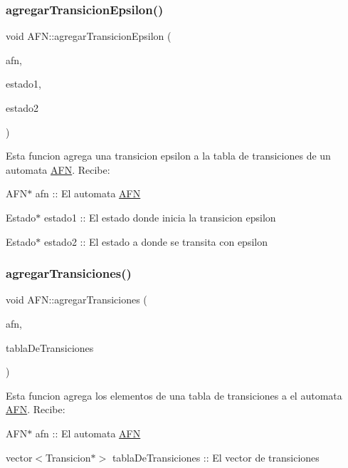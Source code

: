 \subsubsection{\texorpdfstring{agregar\+Transicion\+Epsilon()}{agregarTransicionEpsilon()}}
{\footnotesize\ttfamily void A\+F\+N\+::agregar\+Transicion\+Epsilon (\begin{DoxyParamCaption}\item[{\hyperlink{class_a_f_n}{A\+FN} $\ast$}]{afn,  }\item[{\hyperlink{class_estado}{Estado} $\ast$}]{estado1,  }\item[{\hyperlink{class_estado}{Estado} $\ast$}]{estado2 }\end{DoxyParamCaption})}

Esta funcion agrega una transicion epsilon a la tabla de transiciones de un automata \hyperlink{class_a_f_n}{A\+FN}. Recibe\+:
\begin{DoxyItemize}
\item A\+F\+N$\ast$ afn \+:\+: El automata \hyperlink{class_a_f_n}{A\+FN}
\item Estado$\ast$ estado1 \+:\+: El estado donde inicia la transicion epsilon
\item Estado$\ast$ estado2 \+:\+: El estado a donde se transita con epsilon 
\end{DoxyItemize}\mbox{\label{class_a_f_n_aec249b192efe9df63c9e6df4ef5b96af}} 
\subsubsection{\texorpdfstring{agregar\+Transiciones()}{agregarTransiciones()}}
{\footnotesize\ttfamily void A\+F\+N\+::agregar\+Transiciones (\begin{DoxyParamCaption}\item[{\hyperlink{class_a_f_n}{A\+FN} $\ast$}]{afn,  }\item[{std\+::vector$<$ \hyperlink{class_transicion}{Transicion} $\ast$$>$}]{tabla\+De\+Transiciones }\end{DoxyParamCaption})}

Esta funcion agrega los elementos de una tabla de transiciones a el automata \hyperlink{class_a_f_n}{A\+FN}. Recibe\+:
\begin{DoxyItemize}
\item A\+F\+N$\ast$ afn \+:\+: El automata \hyperlink{class_a_f_n}{A\+FN}
\item vector$<$\+Transicion$\ast$$>$ tabla\+De\+Transiciones \+:\+: El vector de transiciones 
\end{DoxyItemize}\mbox{\label{class_a_f_n_aed4763d61a7630ff6c4810be588c6089}} 
